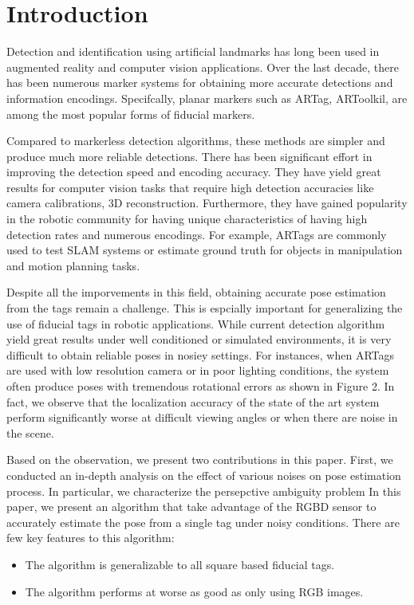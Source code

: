\section{Introduction}
\label{sec:intro}
Detection and identification using artificial landmarks has long been used in augmented reality and computer vision applications. Over the last decade, there has been numerous marker systems for obtaining more accurate detections and information encodings. Specifcally, planar markers such as ARTag, ARToolkil, are among the most popular forms of fiducial markers.

Compared to markerless detection algorithms, these methods are simpler and produce much more reliable detections. There has been significant effort in improving the detection speed and encoding accuracy. They have yield great results for computer vision tasks that require high detection accuracies like camera calibrations, 3D reconstruction. Furthermore, they have gained popularity in the robotic community for having unique characteristics of having high detection rates and numerous encodings. For example, ARTags are commonly used to test SLAM systems or estimate ground truth for objects in manipulation and motion planning tasks. 

Despite all the imporvements in this field, obtaining accurate pose estimation from the tags remain a challenge. This is espcially important for generalizing the use of fiducial tags in robotic applications. While current detection algorithm yield great results under well conditioned or simulated environments, it is very difficult to obtain reliable poses in nosiey settings. For instances, when ARTags are used with low resolution camera or in poor lighting conditions, the system often produce poses with tremendous rotational errors as shown in Figure 2. In fact, we observe that the localization accuracy of the state of the art system perform significantly worse at difficult viewing angles or when there are noise in the scene. 

Based on the observation, we present two contributions in this paper. First, we conducted an in-depth analysis on the effect of various noises on pose estimation process. In particular, we characterize the persepctive ambiguity problem   In this paper, we present an algorithm that take advantage of the RGBD sensor to accurately estimate the pose from a single tag under noisy conditions. There are few key features to this algorithm: 
\begin{itemize}
\item The algorithm is generalizable to all square based fiducial tags.
\item The algorithm performs at worse as good as only using RGB images.
\end{itemize}